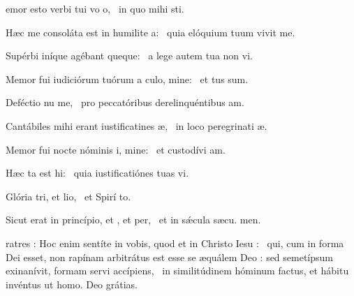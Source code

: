 \begin{psalm}
\begin{intonation}
emor esto verbi tui vo o,~{\gstella} in quo mihi  sti.
\end{intonation}
\begin{verses}
\item Hæc me consoláta est in humilite a:~{\gstella} quia elóquium tuum vivit me.
\item Supérbi iníque agébant queque:~{\gstella} a lege autem tua non vi.
\item Memor fui iudiciórum tuórum a culo, mine:~{\gstella} et tus sum.
\item Deféctio nu me,~{\gstella} pro peccatóribus derelinquéntibus  am.
\item Cantábiles mihi erant iustificatines æ,~{\gstella} in loco peregrinati æ.
\item Memor fui nocte nóminis i, mine:~{\gstella} et custodívi  am.
\item Hæc ta est hi:~{\gstella} quia iustificatiónes tuas vi.
\item Glória tri, et lio,~{\gstella} et Spirí to.
\item Sicut erat in princípio, et , et per,~{\gstella} et in sǽcula sæcu. men.
\end{verses}
\end{psalm}



\begin{lectio}ratres : Hoc enim sentíte in vobis, quod et in Christo Iesu :~{\gcrux} qui, cum in forma Dei esset, non rapínam arbitrátus est esse se æquálem Deo :
sed semetípsum exinanívit, formam servi accípiens,~{\gstella}
in similitúdinem hóminum factus, et hábitu invéntus ut homo.
\R Deo grátias.\end{lectio}



